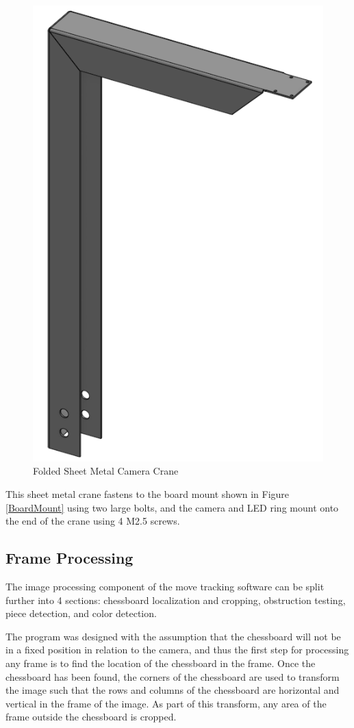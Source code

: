 \documentclass[journal]{IEEEtran}
\begin{document}
\begin{figure}[!ht]
	\centering
	\includegraphics[width=0.7\linewidth]{Images/CameraCrane.png}
	\caption{Folded Sheet Metal Camera Crane}
	\label{Crane}
\end{figure}

This sheet metal crane fastens to the board mount shown in Figure \ref{BoardMount} using two large bolts, and the camera and LED ring mount onto the end of the crane using 4 M2.5 screws.

\vspace{12pt}

\subsection{Frame Processing}
The image processing component of the move tracking software can be split further into 4 sections: chessboard localization and cropping, obstruction testing, piece detection, and color detection. 

The program was designed with the assumption that the chessboard will not be in a fixed position in relation to the camera, and thus the first step for processing any frame is to find the location of the chessboard in the frame. Once the chessboard has been found, the corners of the chessboard are used to transform the image such that the rows and columns of the chessboard are horizontal and vertical in the frame of the image. As part of this transform, any area of the frame outside the chessboard is cropped.
\end{document}
